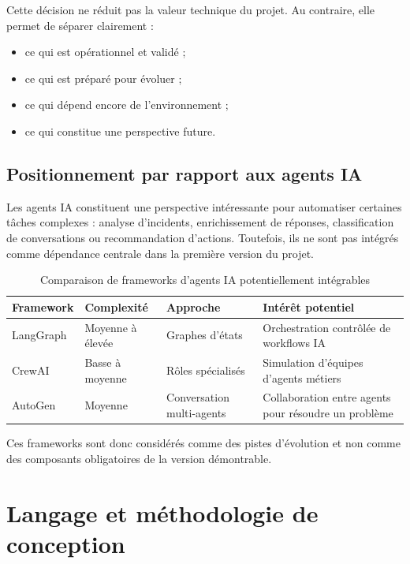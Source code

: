 Cette décision ne réduit pas la valeur technique du projet. Au contraire, elle permet de séparer clairement :

\begin{itemize}
    \item ce qui est opérationnel et validé ;
    \item ce qui est préparé pour évoluer ;
    \item ce qui dépend encore de l’environnement ;
    \item ce qui constitue une perspective future.
\end{itemize}

\subsection{Positionnement par rapport aux agents IA}

Les agents IA constituent une perspective intéressante pour automatiser certaines tâches complexes : analyse d’incidents, enrichissement de réponses, classification de conversations ou recommandation d’actions. Toutefois, ils ne sont pas intégrés comme dépendance centrale dans la première version du projet.

\begin{table}[htbp]
    \centering
    \begin{tabular}{|p{3cm}|p{3cm}|p{3cm}|p{5cm}|}
        \hline
        \textbf{Framework} & \textbf{Complexité} & \textbf{Approche} & \textbf{Intérêt potentiel} \\
        \hline
        LangGraph & Moyenne à élevée & Graphes d’états & Orchestration contrôlée de workflows IA \\
        \hline
        CrewAI & Basse à moyenne & Rôles spécialisés & Simulation d’équipes d’agents métiers \\
        \hline
        AutoGen & Moyenne & Conversation multi-agents & Collaboration entre agents pour résoudre un problème \\
        \hline
    \end{tabular}
    \caption{Comparaison de frameworks d’agents IA potentiellement intégrables}
    \label{tab:frameworks_agents}
\end{table}

Ces frameworks sont donc considérés comme des pistes d’évolution et non comme des composants obligatoires de la version démontrable.

\section{Langage et méthodologie de conception}

